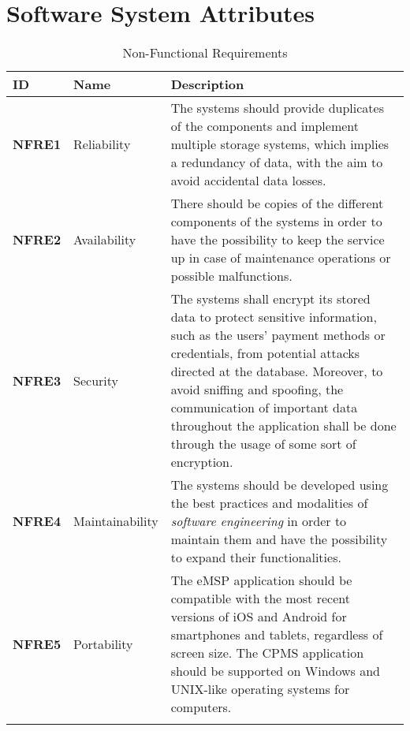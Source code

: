 \section{Software System Attributes}
\label{sec:softwareSystemAttributes}

\begin{longtable}{| p{0.12\linewidth} |p{0.20\linewidth} | p{0.7\linewidth} |}
        \hline
        \rowcolor{bluepoli!40}
         \textbf{ID} & \textbf{Name}& \textbf{Description} \T\B \\
        \hline 
        \hline
        \textbf{NFRE1} & Reliability & The systems should provide duplicates
        of the components and implement multiple storage systems, which implies a redundancy of data, with the aim to avoid accidental data losses. \T\B\\
        \hline
        \textbf{NFRE2} & Availability & There should be copies of the different components of the systems in order to have the possibility to keep the service up in case of maintenance operations or possible malfunctions. \T\B\\
        \hline
        \textbf{NFRE3} & Security & The systems shall encrypt its stored data to protect sensitive information, such as the users' payment methods or credentials, from potential attacks directed at the database. Moreover, to avoid sniffing and spoofing, the communication of important data throughout the application shall be done through the usage of some sort of encryption. \T\B\\
        \hline
        \textbf{NFRE4} & Maintainability & The systems should be developed using the best practices and modalities of \textit{software engineering} in order to maintain them and have the possibility to expand their functionalities. \T\B\\
        \hline
        \textbf{NFRE5} & Portability & The eMSP application should be compatible with the most recent versions of iOS and Android for smartphones and tablets, regardless of screen size. The CPMS application should be supported on Windows and UNIX-like operating systems for computers. \T\B\\
        \hline
    \caption{Non-Functional Requirements}
\end{longtable}
